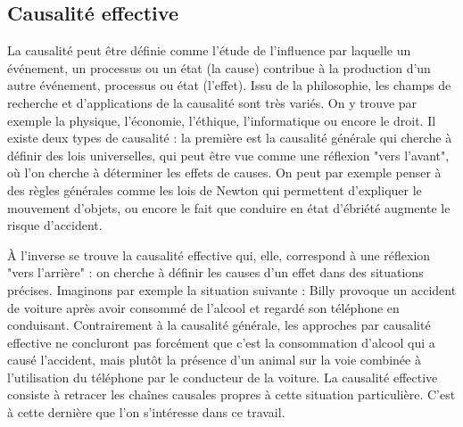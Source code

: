 \subsection{Causalité effective}
La causalité peut être définie comme l'étude de l'influence par laquelle un événement, un processus ou un état (la cause) contribue à la production d'un autre événement, processus ou état (l'effet). Issu de la philosophie, les champs de recherche et d'applications de la causalité sont très variés. On y trouve par exemple la physique, l'économie, l'éthique, l'informatique ou encore le droit. Il existe deux types de causalité \parencite{sarmientolozano} : la première est la causalité générale qui cherche à définir des lois universelles, qui peut être vue comme une réflexion "vers l'avant", où l'on cherche à déterminer les effets de causes. On peut par exemple penser à des règles générales comme les lois de Newton qui permettent d'expliquer le mouvement d'objets, ou encore le fait que conduire en état d'ébriété augmente le risque d'accident.  

À l'inverse se trouve la causalité effective qui, elle, correspond à une réflexion "vers l'arrière" : on cherche à définir les causes d'un effet dans des situations précises. Imaginons par exemple la situation suivante : Billy  provoque un accident de voiture après avoir consommé de l'alcool et regardé son téléphone en conduisant. Contrairement à la causalité générale, les approches par causalité effective  ne concluront pas forcément que c'est la consommation d'alcool qui a causé l'accident, mais plutôt la présence d'un animal sur la voie combinée à l'utilisation du téléphone par le conducteur de la voiture. La causalité effective consiste à retracer les chaînes causales propres à cette situation particulière. C'est à cette dernière que l'on s'intéresse dans ce travail. 

